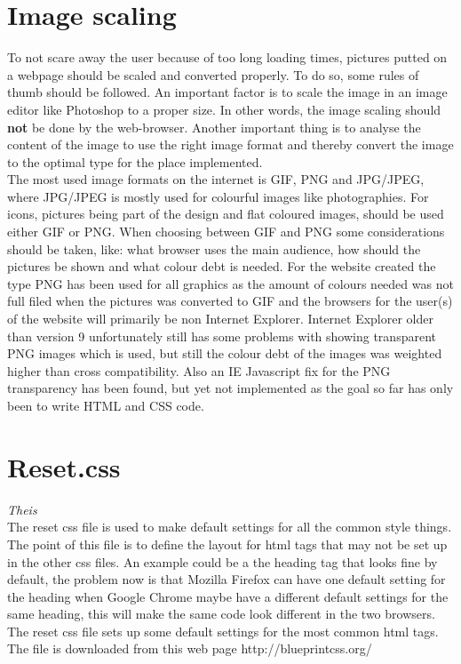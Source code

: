 \section{Image scaling}
To not scare away the user because of too long loading times, pictures putted on a webpage should be scaled and converted properly. To do so, some rules of thumb should be followed. An important factor is to scale the image in an image editor like Photoshop to a proper size. In other words, the image scaling should \textbf{not} be done by the web-browser. Another important thing is to analyse the content of the image to use the right image format and thereby convert the image to the optimal type for the place implemented.
\\The most used image formats on the internet is GIF, PNG and JPG/JPEG, where JPG/JPEG is mostly used for colourful images like photographies. For icons, pictures being part of the design and flat coloured images, should be used either GIF or PNG. When choosing between GIF and PNG some considerations should be taken, like: what browser uses the main audience, how should the pictures be shown and what colour debt is needed. For the website created the type PNG has been used for all graphics as the amount of colours needed was not full filed when the pictures was converted to GIF and the browsers for the user(s) of the website will primarily be non Internet Explorer. Internet Explorer older than version 9 unfortunately still has some problems with showing transparent PNG images which is used, but still the colour debt of the images was weighted higher than cross compatibility. Also an IE Javascript fix for the PNG transparency has been found, but yet not implemented as the goal so far has only been to write HTML and CSS code. 

\section{Reset.css} \textit{Theis}\\
The reset css file is used to make default settings for all the common style things. The point of this file is to define the layout for html tags that may not be set up in the other css files. An example could be a the heading tag that looks fine by default, the problem now is that Mozilla Firefox can have one default setting for the heading when Google Chrome maybe have a different default settings for the same heading, this will make the same code look different in the two browsers. The reset css file sets up some default settings for the most common html tags. The file is downloaded from this web page http://blueprintcss.org/